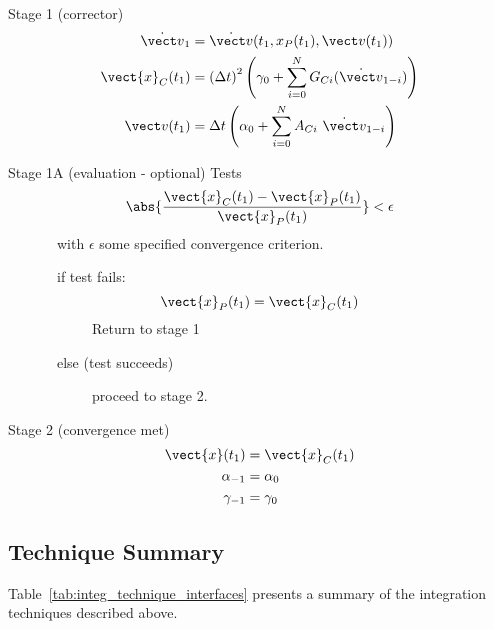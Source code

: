 Stage 1 (corrector)
\begin{equation}
\label{eqn:gauss_jackson_1}
\begin{split}
\dot{\vect v}_{1} &=
  \dot{\vect v}(t_1, x_P(t_1),\vect v(t_1)) \\
\vect{x}_C(t_1) &= \left(\Delta t\right)^{2} \left(\gamma_{0}+
 \sum_{i=0}^{N}G_{Ci}({\dot{\vect v}}_{1-i})\right) \\
\vect v(t_1) &= \Delta t
   \left(\alpha_{0} + \sum_{i=0}^{N}A_{Ci}\ \dot{\vect v}_{1-i}\right) \\
\end{split}
\end{equation}

Stage 1A (evaluation - optional)
Tests
\begin{equation*}
\abs{\frac{\vect{x}_C(t_1) - \vect{x}_P(t_1)}{\vect{x}_P(t_1)}} < \epsilon 
\end{equation*}
\ \ \ \ \ \ \ with $\epsilon$ some specified convergence criterion.  

\ \ \ \ \ \ \ if test fails:
\begin{equation*}
\vect{x}_P(t_1) = \vect{x}_C(t_1)
\end{equation*}
\ \ \ \ \ \ \ \ \ \ \ \ Return to stage 1

\ \ \ \ \ \ \ else (test succeeds) 

\ \ \ \ \ \ \ \ \ \ \ \ proceed to stage 2.

Stage 2 (convergence met)
\begin{equation}
\begin{split}
\vect{x}(t_1) &= \vect{x}_C(t_1) \\
\alpha_{-1} &= \alpha_{0} \\
\gamma_{-1} &= \gamma_0 \\
\end{split}
\end{equation}



\subsection{Technique Summary}

Table~\ref{tab:integ_technique_interfaces} presents a summary of
the integration techniques described above.

